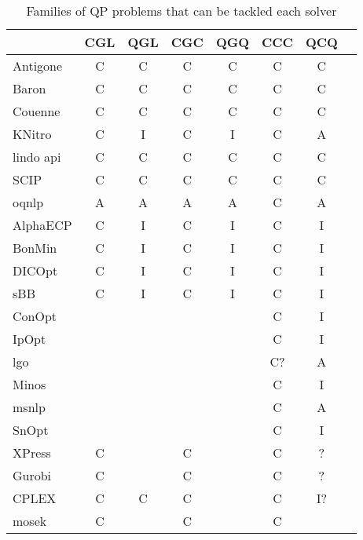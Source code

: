 \begin{table}
{
 \centering                
 \scriptsize                
 \setlength{\tabcolsep}{3pt}                
                
\begin{tabular}{lccccccc}
\toprule  
                 & CGL & QGL & CGC & QGQ & CCC & QCQ \\
\hline
{\sc Antigone}    &  C  &  C  &  C  &  C  &  C  &  C  \\
{\sc Baron}       &  C  &  C  &  C  &  C  &  C  &  C  \\
{\sc Couenne}     &  C  &  C  &  C  &  C  &  C  &  C  \\
{\sc KNitro}      &  C  &  I  &  C  &  I  &  C  &  A  \\
{\sc lindo api}   &  C  &  C  &  C  &  C  &  C  &  C  \\
{\sc SCIP}        &  C  &  C  &  C  &  C  &  C  &  C  \\
{\sc oqnlp}       &  A  &  A  &  A  &  A  &  C  &  A  \\
{\sc AlphaECP}    &  C  &  I  &  C  &  I  &  C  &  I  \\
{\sc BonMin}      &  C  &  I  &  C  &  I  &  C  &  I  \\
{\sc DICOpt}      &  C  &  I  &  C  &  I  &  C  &  I  \\
{\sc sBB}         &  C  &  I  &  C  &  I  &  C  &  I  \\
{\sc ConOpt}      &     &     &     &     &  C  &  I  \\
{\sc IpOpt}       &     &     &     &     &  C  &  I  \\
{\sc lgo}         &     &     &     &     &  C? &  A  \\  %
{\sc Minos}       &     &     &     &     &  C  &  I  \\
{\sc msnlp}       &     &     &     &     &  C  &  A  \\
{\sc SnOpt}       &     &     &     &     &  C  &  I  \\
{\sc XPress}      &  C  &     &  C  &     &  C  &  ?  \\ %
{\sc Gurobi}      &  C  &     &  C  &     &  C  &  ?  \\ %
{\sc CPLEX}       &  C  &  C  &  C  &     &  C  &  I? \\ %
{\sc mosek}       &  C  &     &  C  &     &  C  &     \\
\hline
\end{tabular}                 
\caption{Families of QP problems that can be tackled each solver} \label{t:solvers}             
} 

\end{table}              

